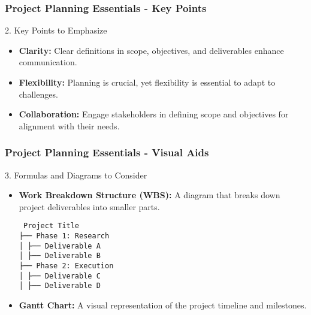 \documentclass[aspectratio=169]{beamer}
\begin{document}
\begin{frame}[fragile]
    \frametitle{Project Planning Essentials - Key Points}
    
    \begin{block}{2. Key Points to Emphasize}
        \begin{itemize}
            \item \textbf{Clarity:} Clear definitions in scope, objectives, and deliverables enhance communication.
            \item \textbf{Flexibility:} Planning is crucial, yet flexibility is essential to adapt to challenges.
            \item \textbf{Collaboration:} Engage stakeholders in defining scope and objectives for alignment with their needs.
        \end{itemize}
    \end{block}
\end{frame}

\begin{frame}[fragile]
    \frametitle{Project Planning Essentials - Visual Aids}
    
    \begin{block}{3. Formulas and Diagrams to Consider}
        \begin{itemize}
            \item \textbf{Work Breakdown Structure (WBS):} A diagram that breaks down project deliverables into smaller parts.
            \begin{center}
            \texttt{
            Project Title \\
            ├── Phase 1: Research \\
            │   ├── Deliverable A \\
            │   ├── Deliverable B \\
            ├── Phase 2: Execution \\
            │   ├── Deliverable C \\
            │   ├── Deliverable D \\
            }
            \end{center}
            
            \item \textbf{Gantt Chart:} A visual representation of the project timeline and milestones.
        \end{itemize}
    \end{block}
\end{frame}
\end{document}
